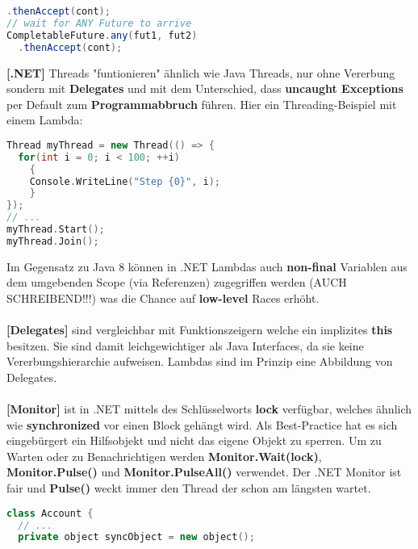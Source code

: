 \documentclass[8pt]{extarticle}
\let\oldtextbf\textbf
\renewcommand{\textbf}{\tiny\oldtextbf}
\begin{document}
\begin{multicols*}{5}
\begin{lstlisting}[language=java]
  .thenAccept(cont);
// wait for ANY Future to arrive
CompletableFuture.any(fut1, fut2)
  .thenAccept(cont);
\end{lstlisting}
\textbf{[.NET]} Threads "funtionieren" ähnlich wie Java Threads, nur ohne Vererbung sondern mit \textbf{Delegates} und mit dem Unterschied, dass \textbf{uncaught Exceptions} per Default zum \textbf{Programmabbruch} führen. Hier ein Threading-Beispiel mit einem Lambda:
\begin{lstlisting}[language=c++]
Thread myThread = new Thread(() => {
  for(int i = 0; i < 100; ++i)
    {
    Console.WriteLine("Step {0}", i);
    }
});
// ...
myThread.Start();
myThread.Join();
\end{lstlisting}
Im Gegensatz zu Java 8 können in .NET Lambdas auch \textbf{non-final} Variablen aus dem umgebenden Scope (via Referenzen) zugegriffen werden (AUCH SCHREIBEND!!!) was die Chance auf \textbf{low-level} Races erhöht.\\\\
\textbf{[Delegates]} sind vergleichbar mit Funktionszeigern welche ein implizites \textbf{this} besitzen. Sie sind damit leichgewichtiger als Java Interfaces, da sie keine Vererbungshierarchie aufweisen. Lambdas sind im Prinzip eine Abbildung von Delegates.\\\\
\textbf{[Monitor]} ist in .NET mittels des Schlüsselworts \textbf{lock} verfügbar, welches ähnlich wie \textbf{synchronized} vor einen Block gehängt wird. Als Best-Practice hat es sich eingebürgert ein Hilfsobjekt und nicht das eigene Objekt zu sperren. Um zu Warten oder zu Benachrichtigen werden \textbf{Monitor.Wait(lock)}, \textbf{Monitor.Pulse()} und \textbf{Monitor.PulseAll()} verwendet. Der .NET Monitor ist fair und \textbf{Pulse()} weckt immer den Thread der schon am längsten wartet.
\begin{lstlisting}[language=c++]
class Account {
  // ...
  private object syncObject = new object();


\end{lstlisting}
\end{multicols*}
\end{document}
